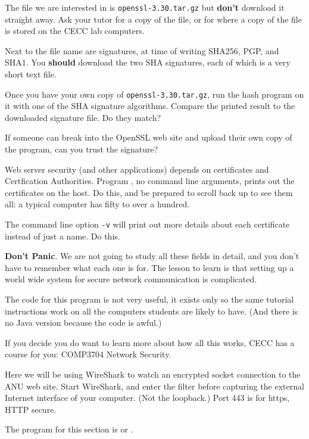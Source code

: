 The file we are interested in is \texttt{openssl-3.30.tar.gz} but \textbf{don't}
download it straight away. Ask your tutor for a copy of the file, or for where
a copy of the file is stored on the CECC lab computers.

Next to the file name are signatures, at time of writing SHA256, PGP, and SHA1.
You \textbf{should} download the two SHA signatures, each of which is a very
short text file.

Once you have your own copy of \texttt{openssl-3.30.tar.gz}, run the hash
program on it with one of the SHA signature algorithms. Compare the printed
result to the downloaded signature file. Do they match?

If someone can break into the OpenSSL web site and upload their own copy of
the program, can you trust the signature?



\STEP Web server security (and other applications) depends on certificates
and Certfication Authorities. Program ,
no command line arguments, prints out the certificates on the host.
Do this, and be prepared to scroll back up to see them all: a typical computer
has fifty to over a hundred.

\STEP The command line option \texttt{-v} will print out more details about
each certificate instead of just a name. Do this.

\textbf{Don't Panic}. We are not going to study all these fields in detail,
and you don't have to remember what each one is for. The lesson to learn
is that setting up a world wide system for secure network communication is
complicated.

The code for this program is not very useful, it exists only so the same
tutorial instructions work on all the computers students are likely to have.
(And there is no Java version because the code is awful.)

If you decide you do want to learn more about how all this works, CECC
has a course for you: COMP3704 Network Security.



Here we will be using WireShark to watch an encrypted socket connection
to the ANU web site. Start WireShark, and enter the filter
before capturing the external Internet interface of your computer. (Not the
loopback.) Port 443 is for https, HTTP secure.

\STEP The program for this section is  or .

